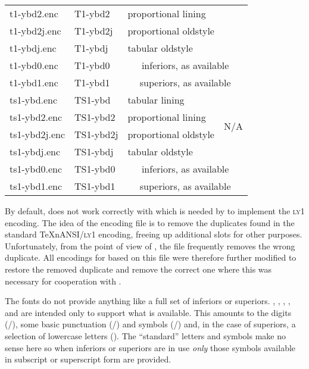 \documentclass[11pt,british]{article}
\begin{document}
\begin{longtable}{llp{}p{}}
		t1-ybd2.enc		&	T1-ybd2		&	proportional lining		&	\\
		t1-ybd2j.enc	&	T1-ybd2j	&	proportional oldstyle	&	\\
		t1-ybdj.enc		&	T1-ybdj		&	tabular oldstyle		&	\\\midrule
		t1-ybd0.enc		&	T1-ybd0		&	\multicolumn{2}{c}{inferiors, as available}\\\midrule
		t1-ybd1.enc		&	T1-ybd1		&	\multicolumn{2}{c}{superiors, as available}\\\midrule
		ts1-ybd.enc		&	TS1-ybd		&	tabular lining			&	\multirow{4}{0.175\textwidth}{N/A}\\
		ts1-ybd2.enc	&	TS1-ybd2	&	proportional lining		&	\\
		ts1-ybd2j.enc	&	TS1-ybd2j	&	proportional oldstyle	&	\\
		ts1-ybdj.enc	&	TS1-ybdj	&	tabular oldstyle		&	\\\midrule
		ts1-ybd0.enc	&	TS1-ybd0	&	\multicolumn{2}{c}{inferiors, as available}\\\midrule
		ts1-ybd1.enc	&	TS1-ybd1	&	\multicolumn{2}{c}{superiors, as available}\\
\end{longtable}

By default,  does not work correctly with  which is needed by  to implement the \textsc{ly1} encoding. The idea of the encoding file is to remove the duplicates found in the standard TeXnANSI/\textsc{ly1} encoding, freeing up additional slots for other purposes. Unfortunately, from the point of view of , the file frequently removes the wrong duplicate. All encodings for  based on this file were therefore further modified to restore the removed duplicate and remove the correct one where this was necessary for cooperation with .

The fonts do not provide anything like a full set of inferiors or superiors. , , , ,  and  are intended only to support what is available. This amounts to the digits (/), some basic punctuation (/) and symbols (\textin{+\pounds\$\textcent\texteuro\textyen}/\textsu{+\pounds\$\textcent\texteuro\textyen}) and, in the case of superiors, a selection of lowercase letters (). The ``standard'' letters and symbols make no sense here so when inferiors or superiors are in use \emph{only} those symbols available in subscript or superscript form are provided.
\end{document}
